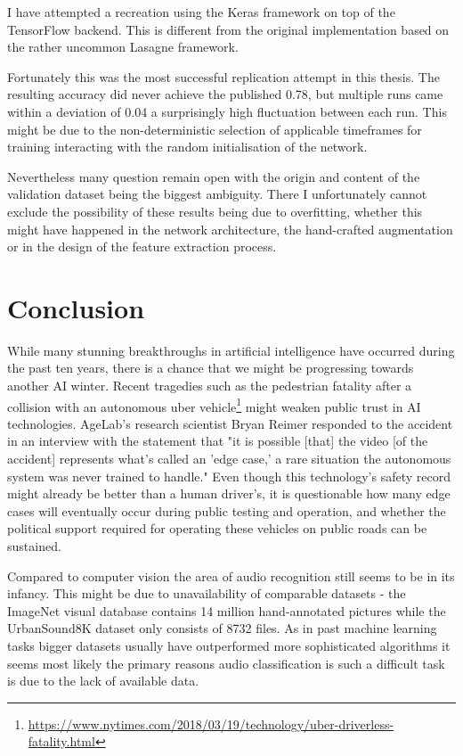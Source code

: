 I have attempted a recreation using the Keras framework on top of the TensorFlow backend. This is different from the original implementation based on the rather uncommon Lasagne framework.

Fortunately this was the most successful replication attempt in this thesis. The resulting accuracy did never  achieve the published 0.78, but multiple runs came within a deviation of 0.04 a surprisingly high fluctuation between each run. This might be due to the non-deterministic selection of applicable timeframes for training interacting with the random initialisation of the network.

Nevertheless many question remain open with the origin and content of the validation dataset being the biggest ambiguity. There I unfortunately cannot exclude the possibility of these results being due to overfitting, whether this might have happened in the network architecture, the hand-crafted augmentation or in the design of the feature extraction process.



\chapter{Conclusion}

While many stunning breakthroughs in artificial intelligence have occurred during the past ten years, there is a chance that we might be progressing towards another AI winter. Recent tragedies such as the pedestrian fatality after a collision with an autonomous uber vehicle\footnote{\url{https://www.nytimes.com/2018/03/19/technology/uber-driverless-fatality.html}} might weaken public trust in AI technologies. AgeLab's research scientist Bryan Reimer responded to the accident in an interview with the statement that "it is possible [that] the video [of the accident] represents what's called an 'edge case,' a rare situation the autonomous system was never trained to handle." Even though this technology's safety record might already be better than a human driver's, it is questionable how many edge cases will eventually occur during public testing and operation, and whether the political support required for operating these vehicles on public roads can be sustained.

Compared to computer vision the area of audio recognition still seems to be in its infancy. This might be due to unavailability of comparable datasets - the ImageNet visual database contains 14 million hand-annotated pictures while the UrbanSound8K dataset only consists of 8732 files. As in past machine learning tasks bigger datasets usually have outperformed more sophisticated algorithms it seems most likely the primary reasons audio classification is such a difficult task is due to the lack of available data.

